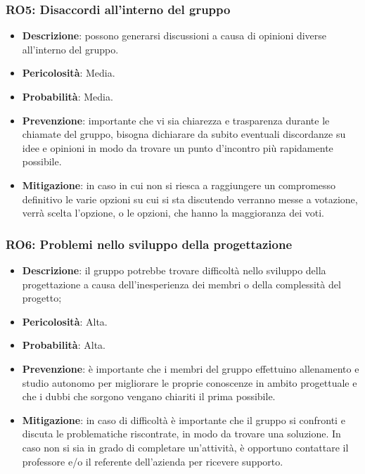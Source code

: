 \subsubsection{RO5: Disaccordi all'interno del gruppo}
\label{rischio:RO5}
\begin{itemize}
    \item \textbf{Descrizione}: possono generarsi discussioni a causa di opinioni diverse all'interno del gruppo.
    \item \textbf{Pericolosità}: Media.
    \item \textbf{Probabilità}: Media.
    \item \textbf{Prevenzione}: importante che vi sia chiarezza e trasparenza durante le chiamate del gruppo, bisogna dichiarare da subito eventuali discordanze su idee e opinioni in modo da trovare un punto d'incontro più rapidamente possibile.
    \item \textbf{Mitigazione}: in caso in cui non si riesca a raggiungere un compromesso definitivo le varie opzioni su cui si sta discutendo verranno messe a votazione, verrà scelta l'opzione, o le opzioni, che hanno la maggioranza dei voti. 
\end{itemize}

\subsubsection{RO6: Problemi nello sviluppo della progettazione}
\label{rischio:RO6}
\begin{itemize}
    \item \textbf{Descrizione}: il gruppo potrebbe trovare difficoltà nello sviluppo della progettazione a causa dell'inesperienza dei membri o della complessità del progetto;
    \item \textbf{Pericolosità}: Alta.
    \item \textbf{Probabilità}: Alta.
    \item \textbf{Prevenzione}: è importante che i membri del gruppo effettuino allenamento e studio autonomo per migliorare le proprie conoscenze in ambito progettuale e che i dubbi che sorgono vengano chiariti il prima possibile.
    \item \textbf{Mitigazione}: in caso di difficoltà è importante che il gruppo si confronti e discuta le problematiche riscontrate, in modo da trovare una soluzione. In caso non si sia in grado di completare un'attività, è opportuno contattare il professore e/o il referente dell'azienda per ricevere supporto.
\end{itemize}


